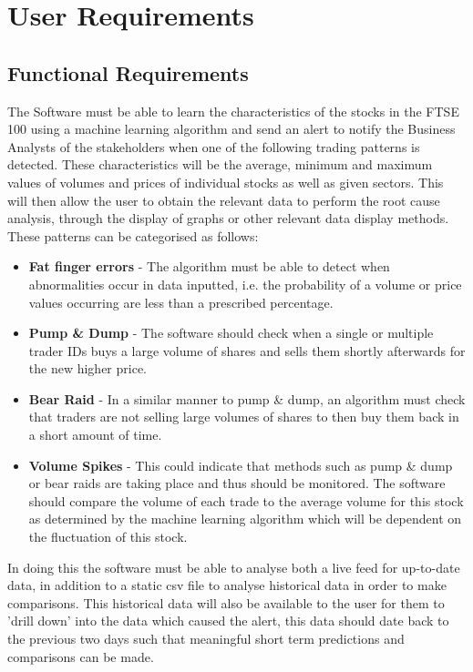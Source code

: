 \documentclass[11pt, oneside, a4paper]{article}
\begin{document}
\section{User Requirements}
\subsection{Functional Requirements}
The Software must be able to learn the characteristics of the stocks in the FTSE 100 using a machine learning
algorithm and send an alert to notify the Business Analysts of the stakeholders when one of the following
trading patterns is detected. These characteristics will be the average, minimum and maximum values of volumes
and prices of individual stocks as well as given sectors. This will then allow the user to obtain the relevant
data to perform the root cause analysis, through the display of graphs or other relevant data display methods.
These patterns can be categorised as follows:
\begin{itemize}
	\item \textbf{Fat finger errors} -  The algorithm must be able to detect when abnormalities occur in data inputted,
	i.e. the probability of a volume or price values occurring are less than a prescribed percentage.
	\item \textbf{Pump \& Dump} - The software should check when a single or multiple trader IDs buys a large volume of
	shares and sells them shortly afterwards for the new higher price.
	\item \textbf{Bear Raid} - In a similar manner to pump \& dump, an algorithm must check that traders are not selling
	large volumes of shares to then buy them back in a short amount of time.
	\item \textbf{Volume Spikes} - This could indicate that methods such as pump \& dump or bear raids are taking place
	and thus should be monitored. The software should compare the volume of each trade to the average volume for
	this stock as determined by the machine learning algorithm which will be dependent on the fluctuation of this stock.
\end{itemize}

In doing this the software must be able to analyse both a live feed for up-to-date data, in addition to a static
csv file to analyse historical data in order to make comparisons. This historical data will also be available to
the user for them to 'drill down' into the data which caused the alert, this data should date back to the previous
two days such that meaningful short term predictions and comparisons can be made.
\end{document}
